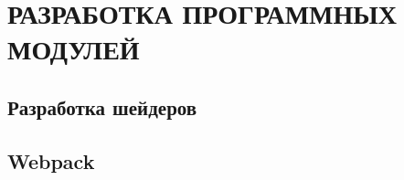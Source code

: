 \section{РАЗРАБОТКА ПРОГРАММНЫХ МОДУЛЕЙ}
\label{sec:dev}

\subsection{Разработка шейдеров}
\label{sub:dev:shader}


\subsection{Webpack}
\label{sub:dev:webpack}

